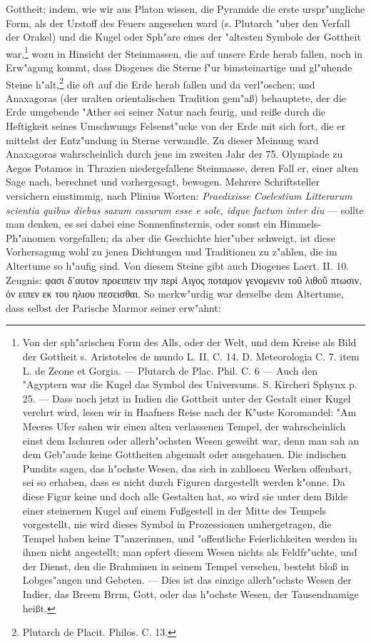 \documentclass[a4paper, 11pt, oneside, polutonikogreek, german]{article}
\begin{document}
Gottheit; indem, wie wir aus Platon wissen, die Pyramide die erste urspr"ungliche Form, als der Urstoff des Feuers angesehen ward (s. Plutarch "uber den Verfall der Orakel) und die Kugel oder Sph"are eines der "altesten Symbole der Gottheit war,\footnote{Von der sph"arischen Form des Alls, oder der Welt, und dem Kreise als Bild der Gottheit s. Aristoteles de mundo L. II. C. 14. D. Meteorologia C. 7. item L. de Zeone et Gorgia. --- Plutarch de Plac. Phil. C. 6 --- Auch den "Agyptern war die Kugel das Symbol des Universums. S. Kircheri Sphynx p. 25. --- Dass noch jetzt in Indien die Gottheit unter der Gestalt einer Kugel verehrt wird, lesen wir in Haafners Reise nach der K"uste Koromandel:
\hspace*{0.5cm} "Am Meeres Ufer sahen wir einen alten verlassenen Tempel, der wahrscheinlich einst dem Ischuren oder allerh"ochsten Wesen geweiht war, denn man sah an dem Geb"aude keine Gottheiten abgemalt oder ausgehauen. Die indischen Pundits sagen, das h"ochste Wesen, das sich in zahllosen Werken offenbart, sei so erhaben, dass es nicht durch Figuren dargestellt werden k"onne. Da diese Figur keine und doch alle Gestalten hat, so wird sie unter dem Bilde einer steinernen Kugel auf einem Fußgestell in der Mitte des Tempels vorgestellt, nie wird dieses Symbol in Prozessionen umhergetragen, die Tempel haben keine T"anzerinnen, und "offentliche Feierlichkeiten werden in ihnen nicht angestellt; man opfert diesem Wesen nichts als Feldfr"uchte, und der Dienst, den die Brahminen in seinem Tempel versehen, besteht bloß in Lobges"angen und Gebeten. --- Dies ist das einzige allerh"ochste Wesen der Indier, das Breem Brrm, Gott, oder das h"ochste Wesen, der Tausendnamige heißt.} wozu in Hinsicht der Steinmassen, die auf unsere Erde herab fallen, noch in Erw"agung kommt, dass Diogenes die Sterne f"ur bimsteinartige und gl"uhende Steine h"alt,\footnote{Plutarch de Placit. Philos. C. 13.} die oft auf die Erde herab fallen und da verl"oschen; und Anaxagoras (der uralten orientalischen Tradition gem"aß) behauptete, der die Erde umgebende "Ather sei seiner Natur nach feurig, und reiße durch die Heftigkeit seines Umschwungs Felsenst"ucke von der Erde mit sich fort, die er mittelst der Entz"undung in Sterne verwandle. Zu dieser Meinung ward Anaxagoras wahrscheinlich durch jene im zweiten Jahr der 75. Olympiade zu Aegos Potamos in Thrazien niedergefallene Steinmasse, deren Fall er, einer alten Sage nach, berechnet und vorhergesagt, bewogen. Mehrere Schriftsteller versichern einstimmig, nach Plinius Worten: \emph{Praedixisse Coelestium Litterarum scientia quibus diebus saxum casurum esse e sole, idque factum inter diu} --- sollte man denken, es sei dabei eine Sonnenfinsternis, oder sonst ein Himmels-Ph"anomen vorgefallen; da aber die Geschichte hier"uber schweigt, ist diese Vorhersagung wohl zu jenen Dichtungen und Traditionen zu z"ahlen, die im Altertume so h"aufig sind. Von diesem Steine gibt auch Diogenes Laert. II. 10. Zeugnis: φασι δ'αυτον προειπειν την περἰ Αιγος ποταμον γενομενιν τοῦ λιθοῦ πτωσιν, ὀν ειπεν εκ του ηλιου πεσεισθαι. So merkw"urdig war derselbe dem Altertume, dass selbst der Parische Marmor seiner erw"ahnt:
\end{document}
